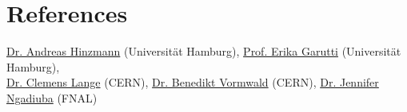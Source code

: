 \section{{References}}
 \href{mailto:andreas.hinzmann@cern.ch}{Dr. Andreas Hinzmann} (Universit\"{a}t Hamburg), \href{mailto:erika.garutti@desy.de}{Prof. Erika Garutti} (Universit\"{a}t Hamburg),\\
  \href{mailto:clemens.lange@cern.ch}{Dr. Clemens Lange} (CERN),  
\href{mailto:benedikt.vormwald@cern.ch}{Dr. Benedikt Vormwald} (CERN), \href{mailto:jennifer.ngadiuba@cern.ch}{Dr. Jennifer Ngadiuba} (FNAL)
